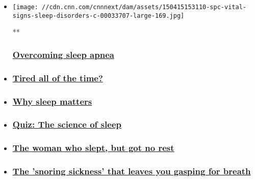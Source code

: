 \begin{itemize}
\item
  \href{/videos/intl_tv-shows/2015/04/15/spc-vital-signs-sleep-disorders-c.cnn}{}

  \texttt{[image: //cdn.cnn.com/cnnnext/dam/assets/150415153110-spc-vital-signs-sleep-disorders-c-00033707-large-169.jpg]}

  **

  \hypertarget{overcoming-sleep-apnea}{%
  \subsubsection{\texorpdfstring{\href{/videos/intl_tv-shows/2015/04/15/spc-vital-signs-sleep-disorders-c.cnn}{Overcoming
  sleep apnea}}{Overcoming sleep apnea}}\label{overcoming-sleep-apnea}}
\item
  \hypertarget{tired-all-of-the-time-}{%
  \subsubsection{\texorpdfstring{\href{/videos/intl_tv-shows/2015/04/15/spc-vital-signs-sleep-disorders-b.cnn}{Tired
  all of the time?
  }}{Tired all of the time? }}\label{tired-all-of-the-time-}}
\item
  \hypertarget{why-sleep-matters}{%
  \subsubsection{\texorpdfstring{\href{/videos/intl_tv-shows/2015/04/15/spc-vital-signs-sleep-disorders-a.cnn}{Why
  sleep matters}}{Why sleep matters}}\label{why-sleep-matters}}
\item
  \hypertarget{quiz-the-science-of-sleep}{%
  \subsubsection{\texorpdfstring{\href{/2015/05/08/health/sleep-science-quiz/index.html}{Quiz:
  The science of
  sleep}}{Quiz: The science of sleep}}\label{quiz-the-science-of-sleep}}
\item
  \hypertarget{the-woman-who-slept-but-got-no-rest}{%
  \subsubsection{\texorpdfstring{\href{/2015/04/22/health/hypersomnia-woman-always-tired/index.html}{The
  woman who slept, but got no
  rest}}{The woman who slept, but got no rest}}\label{the-woman-who-slept-but-got-no-rest}}
\item
  \hypertarget{the-snoring-sickness-that-leaves-you-gasping-for-breath}{%
  \subsubsection{\texorpdfstring{\href{/2015/04/17/health/sleep-apnea-snoring-sickness/index.html}{The
  'snoring sickness' that leaves you gasping for
  breath}}{The 'snoring sickness' that leaves you gasping for breath}}\label{the-snoring-sickness-that-leaves-you-gasping-for-breath}}
\end{itemize}

